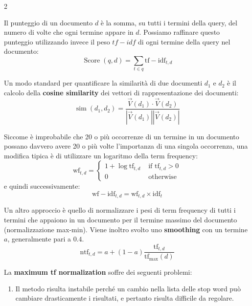 \documentclass[\main/main.tex]{subfiles}
\begin{document}
\begin{multicols}{2}
\begin{definition}
    Il punteggio di un documento \(d\) è la somma, su tutti i termini della query, del numero di volte che ogni termine appare in \(d\). Possiamo raffinare questo punteggio utilizzando invece il peso \(tf-idf\) di ogni termine della query nel documento:
    \[
        \operatorname{Score}(q, d)=\sum_{t \in q} \mathrm{tf}-\mathrm{idf}_{t, d}
    \]
\end{definition}
\begin{observation}
    Un modo standard per quantificare la similarità di due documenti \(d_1\) e \(d_2\) è il calcolo della \textbf{cosine similarity} dei vettori di rappresentazione dei documenti:
    \[
        \operatorname{sim}\left(d_{1}, d_{2}\right)=\frac{\vec{V}\left(d_{1}\right) \cdot \vec{V}\left(d_{2}\right)}{\left|\vec{V}\left(d_{1}\right)\right|\left|\vec{V}\left(d_{2}\right)\right|}
    \]
\end{observation}
\begin{definition}
    Siccome è improbabile che 20 o più occorrenze di un termine in un documento possano davvero avere 20 o più volte l'importanza di una singola occorrenza, una modifica tipica è di utilizzare un logaritmo della term frequency:
    \[
        \mathrm{wf}_{t, d}=\left\{\begin{array}{ll}{1+\log \mathrm{tf}_{t, d}} & {\text { if } \mathrm{tf}_{t, d}>0} \\ {0} & {\text { otherwise }}\end{array}\right.
    \]
    e quindi successivamente:
    \[
        \mathrm{wf}-\mathrm{idf}_{t, d}=\mathrm{wf}_{t, d} \times \mathrm{idf}_{t}
    \]
\end{definition}
\begin{definition}
    Un altro approccio è quello di normalizzare i pesi di term frequency di tutti i termini che appaiono in un documento per il termine massimo del documento (normalizzazione max-min). Viene inoltro svolto uno \textbf{smoothing} con un termine \(a\), generalmente pari a \(0.4\).
    \[
        \mathrm{ntf}_{t, d}=a+(1-a) \frac{\mathrm{tf}_{t, d}}{\mathrm{tf}_{\max }(d)}
    \]
\end{definition}
\begin{observation}
    La \textbf{maximum tf normalization} soffre dei seguenti problemi:
    \begin{enumerate}
        \item Il metodo risulta instabile perché un cambio nella lista delle stop word può cambiare drasticamente i risultati, e pertanto risulta difficile da regolare.

\end{enumerate}
\end{observation}
\end{multicols}
\end{document}
